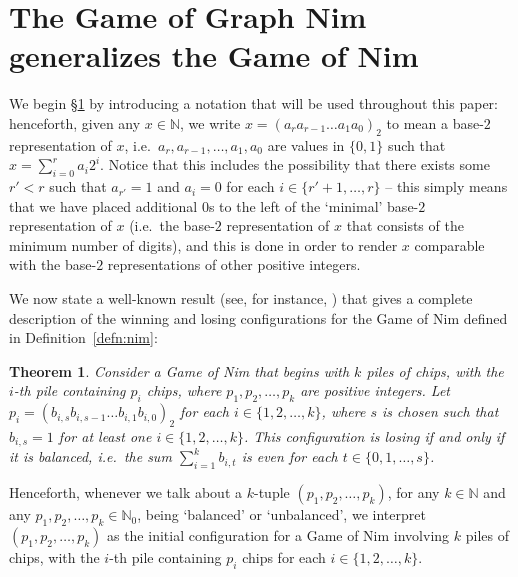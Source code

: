 \documentclass[11pt,reqno]{amsart}
\newtheorem{theorem}{Theorem}[section]
\theoremstyle{definition}
\theoremstyle{definition}
\begin{document}
\section{The Game of Graph Nim generalizes the Game of Nim}\label{sec:prelim_useful_results}
We begin \S\ref{sec:prelim_useful_results} by introducing a notation that will be used throughout this paper: henceforth, given any $x\in\mathbb{N}$, we write $x=(a_{r}a_{r-1}\ldots a_{1}a_{0})_{2}$ to mean a base-$2$ representation of $x$, i.e.\ $a_{r}, a_{r-1}, \ldots, a_{1}, a_{0}$ are values in $\{0,1\}$ such that $x=\sum_{i=0}^{r}a_{i}2^{i}$. Notice that this includes the possibility that there exists some $r'<r$ such that $a_{r'}=1$ and $a_{i}=0$ for each $i\in\{r'+1,\ldots,r\}$ -- this simply means that we have placed additional $0$s to the left of the `minimal' base-$2$ representation of $x$ (i.e.\ the base-$2$ representation of $x$ that consists of the minimum number of digits), and this is done in order to render $x$ comparable with the base-$2$ representations of other positive integers.

We now state a well-known result (see, for instance, \cite{brualdi1977introductory}) that gives a complete description of the winning and losing configurations for the Game of Nim defined in Definition~\ref{defn:nim}:
\begin{theorem}\label{thm:Nim}
Consider a Game of Nim that begins with $k$ piles of chips, with the $i$-th pile containing $p_{i}$ chips, where $p_{1}, p_{2}, \ldots, p_{k}$ are positive integers. Let $p_{i}=\left(b_{i,s}b_{i,s-1}\ldots b_{i,1}b_{i,0}\right)_{2}$ for each $i \in \{1,2,\ldots,k\}$, where $s$ is chosen such that $b_{i,s}=1$ for at least one $i \in \{1,2,\ldots,k\}$. This configuration is losing if and only if it is \emph{balanced}, i.e.\ the sum $\sum_{i=1}^{k}b_{i,t}$ is even for each $t \in \{0,1,\ldots,s\}$.
\end{theorem}
Henceforth, whenever we talk about a $k$-tuple $(p_{1},p_{2},\ldots,p_{k})$, for any $k \in \mathbb{N}$ and any $p_{1},p_{2},\ldots,p_{k} \in \mathbb{N}_{0}$, being `balanced' or `unbalanced', we interpret $(p_{1},p_{2},\ldots,p_{k})$ as the initial configuration for a Game of Nim involving $k$ piles of chips, with the $i$-th pile containing $p_{i}$ chips for each $i \in \{1,2,\ldots,k\}$.  
\end{document}
